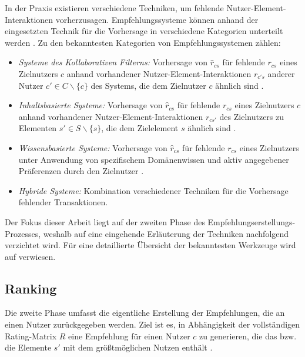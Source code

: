 In der Praxis existieren verschiedene Techniken, um fehlende Nutzer-Ele\-ment-Interaktionen vorherzusagen.
Empfehlungssysteme können anhand der eingesetzten Technik für die Vorhersage in verschiedene Kategorien unterteilt werden \cite[S. 8 ff.]{recommenderSystems:2016}.
Zu den bekanntesten Kategorien von Empfehlungssystemen zählen:
\begin{itemize}
	\item \textit{Systeme des Kollaborativen Filterns:} Vorhersage von $\hat{r}_{cs}$ für fehlende $r_{cs}$ eines Zielnutzers $c$ anhand vorhandener Nutzer-Ele\-ment-Interaktionen $r_{c's}$ anderer Nutzer $c' \in C \backslash \{c\}$ des Systems, die dem Zielnutzer $c$ ähnlich sind \cite[S. 737]{adomavicius:inproceedings}.
	\item \textit{Inhaltsbasierte Systeme:} Vorhersage von $\hat{r}_{cs}$ für fehlende $r_{cs}$ eines Zielnutzers $c$ anhand vorhandener Nutzer-Ele\-ment-Interaktionen $r_{cs'}$ des Zielnutzers zu Elementen $s' \in S \backslash \{s\}$, die dem Zielelement $s$ ähnlich sind \cite[S. 735]{adomavicius:inproceedings}.
	\item \textit{Wissensbasierte Systeme:} Vorhersage von $\hat{r}_{cs}$ für fehlende $r_{cs}$ eines Zielnutzers unter Anwendung von spezifischem Domänenwissen und aktiv angegebener Präferenzen durch den Zielnutzer \cite[S. 16f.]{recommenderSystems:2016}.
	\item \textit{Hybride Systeme:} Kombination verschiedener Techniken für die Vorhersage fehlender Transaktionen.
\end{itemize}

Der Fokus dieser Arbeit liegt auf der zweiten Phase des Empfehlungserstel\-lungs-Prozesses, weshalb auf eine eingehende Erläuterung der Techniken nachfolgend verzichtet wird.
Für eine detaillierte Übersicht der bekanntesten Werkzeuge wird auf \textcite[S. 8ff.]{recommenderSystems:2016} verwiesen.

\subsection{Ranking}
\label{ch:empfehlungssysteme:empfehlungserstellung:recommendation}
Die zweite Phase umfasst die eigentliche Erstellung der Empfehlungen, die an einen Nutzer zurückgegeben werden.
Ziel ist es, in Abhängigkeit der vollständigen Rating-Matrix $R$ eine Empfehlung für einen Nutzer $c$ zu generieren, die das bzw. die Elemente $s'$ mit dem größtmöglichen Nutzen enthält \cite[S. 87]{ekstrand:article}\cite[S. 898]{adomavicius:article}.

